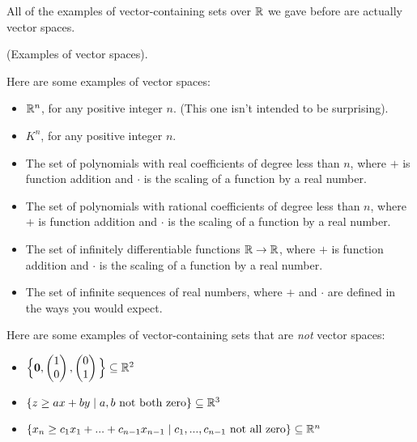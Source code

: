 All of the examples of vector-containing sets over $\mathbb{R}$ we gave before are actually vector spaces.

\begin{remark}
    (Examples of vector spaces).
    
    Here are some examples of vector spaces:
    
    \begin{itemize}
        \item $\mathbb{R}^n$, for any positive integer $n$. (This one isn't intended to be surprising).
        \item $K^n$, for any positive integer $n$.
        \item The set of polynomials with real coefficients of degree less than $n$, where $+$ is function addition and $\cdot$ is the scaling of a function by a real number.
        \item The set of polynomials with rational coefficients of degree less than $n$, where $+$ is function addition and $\cdot$ is the scaling of a function by a real number.
        \item The set of infinitely differentiable functions $\mathbb{R} \rightarrow \mathbb{R}$, where $+$ is function addition and $\cdot$ is the scaling of a function by a real number.
        \item The set of infinite sequences of real numbers, where $+$ and $\cdot$ are defined in the ways you would expect.
    \end{itemize}
    
    Here are some examples of vector-containing sets that are \textit{not} vector spaces:
    
    \begin{itemize}
        \item $\Big\{ \mathbf{0}, \begin{pmatrix} 1 \\ 0 \end{pmatrix}, \begin{pmatrix} 0 \\ 1 \end{pmatrix} \Big\} \subseteq \mathbb{R}^2$
        \item $\{ z \geq ax + by \mid \text{$a, b$ not both zero} \} \subseteq \mathbb{R}^3$
        \item $\{ x_n \geq c_1 x_1 + ... + c_{n - 1} x_{n - 1} \mid \text{$c_1, ..., c_{n - 1}$ not all zero}\} \subseteq \mathbb{R}^n$
    \end{itemize}
\end{remark}

